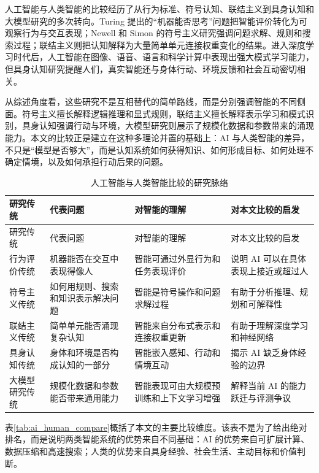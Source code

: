 \documentclass[UTF8,zihao=-4,a4paper]{ctexart}
\begin{document}
人工智能与人类智能的比较经历了从行为标准、符号认知、联结主义到具身认知和大模型研究的多次转向。Turing 提出的“机器能否思考”问题把智能评价转化为可观察行为与交互表现\cite{turing1950computing}；Newell 和 Simon 的符号主义研究强调问题求解、规则和搜索过程\cite{newell1972human}；联结主义则把认知解释为大量简单单元连接权重变化的结果。进入深度学习时代后，人工智能在图像、语音、语言和科学计算中表现出强大模式学习能力，但具身认知研究提醒人们，真实智能还与身体行动、环境反馈和社会互动密切相关\cite{varela1991embodied,clark1997being}。

从综述角度看，这些研究不是互相替代的简单路线，而是分别强调智能的不同侧面。符号主义擅长解释逻辑推理和显式规则，联结主义擅长解释表示学习和模式识别，具身认知强调行动与环境，大模型研究则展示了规模化数据和参数带来的涌现能力。本文的比较正是建立在这种多理论并置的基础上：AI 与人类智能的差异，不只是“模型是否够大”，而是认知系统如何获得知识、如何形成目标、如何处理不确定情境，以及如何承担行动后果的问题。

\begin{longtable}{p{2.8cm}p{3.0cm}p{4.2cm}p{4.0cm}}
\caption{人工智能与人类智能比较的研究脉络}
\label{tab:ai_human_literature}\\
\toprule
研究传统 & 代表问题 & 对智能的理解 & 对本文比较的启发 \\
\midrule
\endfirsthead
\toprule
研究传统 & 代表问题 & 对智能的理解 & 对本文比较的启发 \\
\midrule
\endhead
行为评价传统 & 机器能否在交互中表现得像人 & 智能可通过外显行为和任务表现评价 & 说明 AI 可以在具体表现上接近或超过人 \\
符号主义传统 & 如何用规则、搜索和知识表示解决问题 & 智能是符号操作和问题求解过程 & 有助于分析推理、规划和可解释性 \\
联结主义传统 & 简单单元能否涌现复杂认知 & 智能来自分布式表示和连接权重更新 & 有助于理解深度学习和神经网络 \\
具身认知传统 & 身体和环境是否构成认知的一部分 & 智能嵌入感知、行动和情境互动 & 揭示 AI 缺乏身体经验的边界 \\
大模型研究传统 & 规模化数据和参数能否带来通用能力 & 智能表现可由大规模预训练和上下文学习增强 & 解释当前 AI 的能力跃迁与评测争议 \\
\bottomrule
\end{longtable}

表\ref{tab:ai_human_compare}概括了本文的主要比较维度。该表不是为了给出绝对排名，而是说明两类智能系统的优势来自不同基础：AI 的优势来自可扩展计算、数据压缩和高速搜索；人类的优势来自具身经验、社会生活、主动目标和价值判断。
\end{document}
